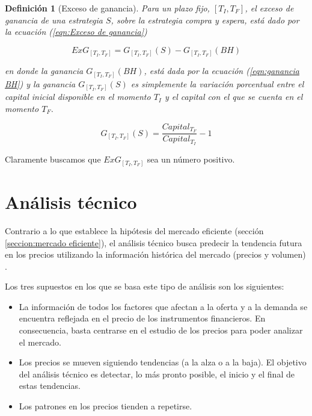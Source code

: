 \documentclass[12pt]{report}
\theoremstyle{break}
\newtheorem{definicion}{Definición}[chapter]
\theoremstyle{break}
\begin{document}
\begin{definicion}[Exceso de ganancia]
\label{definicion:exceso de ganancia}
Para un plazo fijo, $\left[T_{I}, T_{F}\right]$, el exceso de ganancia de una estrategia $S$, sobre la estrategia \textit{compra y espera}, está dado por la ecuación (\ref{eqn:Exceso de ganancia})

\begin{equation} \label{eqn:Exceso de ganancia}
ExG_{\left[T_{I}, T_{F}\right]} = G_{\left[T_{I}, T_{F}\right]} (S) - G_{\left[T_{I}, T_{F}\right]} (BH)
\end{equation}

en donde la ganancia $G_{\left[T_{I}, T_{F}\right]} (BH)$, está dada por la ecuación (\ref{eqn:ganancia BH}) y la ganancia $G_{\left[T_{I}, T_{F}\right]} (S)$ es simplemente la variación porcentual entre el capital inicial disponible en el momento $T_{I}$ y el capital con el que se cuenta en el momento $T_{F}$.

\begin{equation} \label{eqn:Ganancia estrategia S}
G_{\left[T_{I}, T_{F}\right]}(S) = \dfrac{Capital_{T_F}}{Capital_{T_I} } - 1 
\end{equation}
\end{definicion}
Claramente buscamos que $ExG_{\left[T_{I}, T_{F}\right]}$ sea un número positivo.

\section{Análisis técnico}
\label{seccion:analisisTecnico}
Contrario a lo que establece la hipótesis del mercado eficiente (sección \ref{seccion:mercado eficiente}), el análisis técnico busca predecir la tendencia futura en los precios utilizando la información histórica del mercado (precios y volumen) \cite{murphy1999technical}.

Los tres supuestos en los que se basa este tipo de análisis son los siguientes:

\begin{itemize}
\item La información de todos los factores que afectan a la oferta y a la demanda se encuentra reflejada en el precio de los instrumentos financieros. En consecuencia, basta centrarse en el estudio de los precios para poder analizar el mercado.

\item Los precios se mueven siguiendo tendencias (a la alza o a la baja). El objetivo del análisis técnico es detectar, lo más pronto posible, el inicio y el final de estas tendencias.

\item Los patrones en los precios tienden a repetirse.
\end{itemize}
\end{document}
